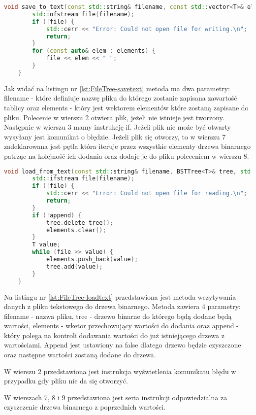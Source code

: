 \begin{lstlisting}[caption=Metoda \texttt{save\_to\_file}, label={lst:FileTree-savetext}, language=C++]
	void save_to_text(const std::string& filename, const std::vector<T>& elements) {
		std::ofstream file(filename);
		if (!file) {
			std::cerr << "Error: Could not open file for writing.\n";
			return;
		}
		for (const auto& elem : elements) {
			file << elem << " ";
		}
	}
\end{lstlisting}

Jak widać na listingu nr \ref{lst:FileTree-savetext} metoda ma dwa parametry: filename - które definiuje nazwę pliku do którego zostanie zapisana zawartość tablicy oraz elements - który jest wektorem elementów które zostaną zapisane do pliku. Polecenie w wierszu 2 otwiera plik, jeżeli nie istnieje jest tworzony.
Następnie w wierszu 3 mamy instrukcję if. Jeżeli plik nie może być otwarty wysyłany jest komunikat o błędzie. Jeżeli plik się otworzy, to w wierszu 7 zadeklarowana jest pętla która iteruje przez wszystkie elementy drzewa binarnego patrząc na kolejność ich dodania oraz dodaje je do pliku poleceniem w wierszu 8.


\begin{lstlisting}[caption=Metoda \texttt{load\_to\_file}, label={lst:FileTree-loadtext}, language=C++]
	void load_from_text(const std::string& filename, BSTTree<T>& tree, std::vector<T>& elements, bool append = false) {
		std::ifstream file(filename);
		if (!file) {
			std::cerr << "Error: Could not open file for reading.\n";
			return;
		}
		if (!append) {
			tree.delete_tree();
			elements.clear();
		}
		T value;
		while (file >> value) {
			elements.push_back(value);
			tree.add(value);
		}
	}
\end{lstlisting}

Na listingu nr \ref{lst:FileTree-loadtext} przedstawiona jest metoda wczytywania danych z pliku tekstowego do drzewa binarnego. Metoda zawiera 4 parametry: filename - nazwa pliku, tree - drzewo binarne do którego będą dodane będą wartości, elements - wketor przechowujący wartości do dodania oraz append - który polega na kontroli dodawania wartości do już istniejącego drzewa z wartościami. Append jest ustawiony na false dlatego drzewo będzie czyszczone oraz następne wartości zostaną dodane do drzewa.

W wierszu 2 przedstawiona jest instrukcja wyświetlenia komunikatu błędu w przypadku gdy pliku nie da się otworzyć.

W wierszach 7, 8 i 9 przedstawiona jest seria instrukcji odpowiedzialna za czyszczenie drzewa binarnego z poprzednich wartości.

